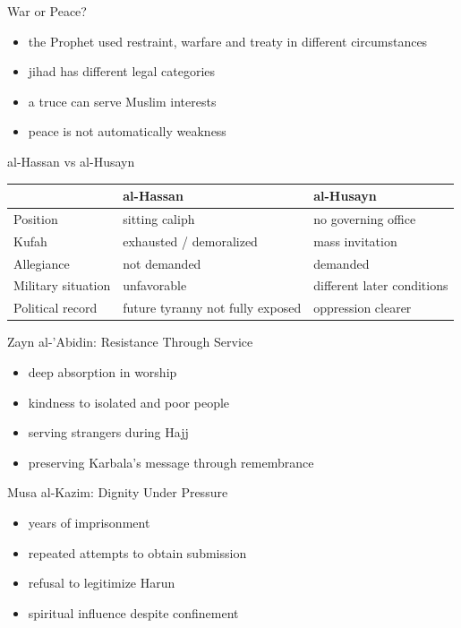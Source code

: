 \documentclass[11pt,aspectratio=169]{beamer}
\begin{document}
\begin{frame}{War or Peace?}
\begin{itemize}
\item the Prophet used restraint, warfare and treaty in different circumstances
\item jihad has different legal categories
\item a truce can serve Muslim interests
\item peace is not automatically weakness
\end{itemize}
\end{frame}

\begin{frame}{al-Hassan vs al-Husayn}
\centering\scriptsize
\renewcommand{\arraystretch}{1.35}
\begin{tabular}{|l|p{4.5cm}|p{4.5cm}|}\hline
&\textbf{al-Hassan}&\textbf{al-Husayn}\\\hline
Position&sitting caliph&no governing office\\\hline
Kufah&exhausted / demoralized&mass invitation\\\hline
Allegiance&not demanded&demanded\\\hline
Military situation&unfavorable&different later conditions\\\hline
Political record&future tyranny not fully exposed&oppression clearer\\\hline
\end{tabular}
\end{frame}

\begin{frame}{Zayn al-'Abidin: Resistance Through Service}
\begin{itemize}
\item deep absorption in worship
\item kindness to isolated and poor people
\item serving strangers during Hajj
\item preserving Karbala's message through remembrance
\end{itemize}
\end{frame}

\begin{frame}{Musa al-Kazim: Dignity Under Pressure}
\begin{itemize}
\item years of imprisonment
\item repeated attempts to obtain submission
\item refusal to legitimize Harun
\item spiritual influence despite confinement
\end{itemize}
\end{frame}
\end{document}
